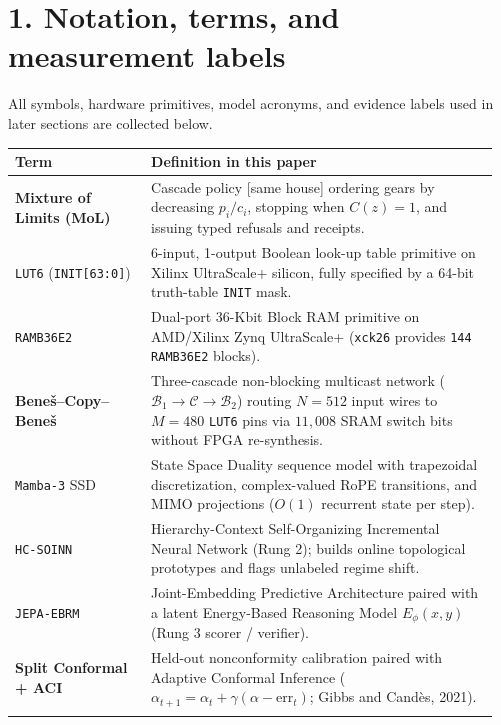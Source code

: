 \documentclass[10pt]{article}
\begin{document}
\section{1. Notation, terms, and measurement labels}\label{notation}

All symbols, hardware primitives, model acronyms, and evidence labels used in later sections are collected below.

{\footnotesize
\begin{longtable}{@{}L{0.27\linewidth}L{0.69\linewidth}@{}}
\toprule
\textbf{Term} & \textbf{Definition in this paper} \\
\midrule
\endhead
\textbf{Mixture of Limits (MoL)} & Cascade policy [same house] ordering gears by decreasing $p_i / c_i$, stopping when $C(z)=1$, and issuing typed refusals and receipts. \\
\addlinespace[3pt]
\texttt{LUT6} (\texttt{INIT[63:0]}) & 6-input, 1-output Boolean look-up table primitive on Xilinx UltraScale+ silicon, fully specified by a 64-bit truth-table \texttt{INIT} mask. \\
\addlinespace[3pt]
\texttt{RAMB36E2} & Dual-port 36-Kbit Block RAM primitive on AMD/Xilinx Zynq UltraScale+ (\texttt{xck26} provides \texttt{144} \texttt{RAMB36E2} blocks). \\
\addlinespace[3pt]
\textbf{Bene\v{s}--Copy--Bene\v{s}} & Three-cascade non-blocking multicast network ($\mathcal{B}_1 \to \mathcal{C} \to \mathcal{B}_2$) routing $N=512$ input wires to $M=480$ \texttt{LUT6} pins via $11{,}008$ SRAM switch bits without FPGA re-synthesis. \\
\addlinespace[3pt]
\texttt{Mamba-3} SSD & State Space Duality sequence model with trapezoidal discretization, complex-valued RoPE transitions, and MIMO projections ($O(1)$ recurrent state per step). \\
\addlinespace[3pt]
\texttt{HC-SOINN} & Hierarchy-Context Self-Organizing Incremental Neural Network (Rung 2); builds online topological prototypes and flags unlabeled regime shift. \\
\addlinespace[3pt]
\texttt{JEPA-EBRM} & Joint-Embedding Predictive Architecture paired with a latent Energy-Based Reasoning Model $E_\phi(x,y)$ (Rung 3 scorer / verifier). \\
\addlinespace[3pt]
\textbf{Split Conformal + ACI} & Held-out nonconformity calibration paired with Adaptive Conformal Inference ($\alpha_{t+1} = \alpha_t + \gamma(\alpha - \text{err}_t)$; Gibbs and Cand\`es, 2021). \\
\addlinespace[3pt]

\end{longtable}}
\end{document}
